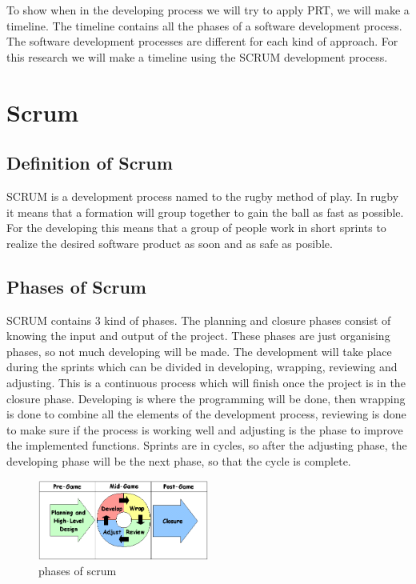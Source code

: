 To show when in the developing process we will try to apply PRT, we will make a timeline. The timeline contains all the phases of a software development process. The software development processes are different for each kind of approach. For this research we will make a timeline using the SCRUM development process.
\section{Scrum} 
\subsection{Definition of Scrum}
SCRUM is a development process named to the rugby method of play. In rugby it means that a formation will group together to gain the ball as fast as possible. For the developing this means that a group of people work in short sprints to realize the desired software product as soon and as safe as posible. 
\subsection{Phases of Scrum}
SCRUM contains 3 kind of phases. The planning and closure phases consist of knowing the input and output of the project. These phases are just organising phases, so not much developing will be made. The development will take place during the sprints which can be divided in developing, wrapping, reviewing and adjusting. This is a continuous process which will finish once the project is in the closure phase. Developing is where the programming will be done, then wrapping is done to combine all the elements of the development process, reviewing is done to make sure if the process is working well and adjusting is the phase to improve the implemented functions. Sprints are in cycles, so after the adjusting phase, the developing phase will be the next phase, so that the cycle is complete.

\begin{figure}[h]
\begin{center}
	\includegraphics[width=0.5\textwidth]{Figures/diagram01.png}
\end{center}
	\caption{phases of scrum}

\end{figure}

